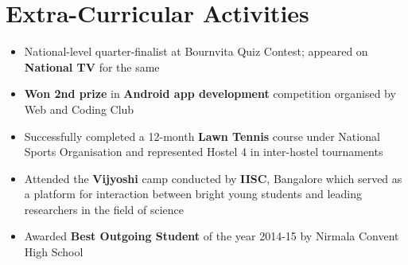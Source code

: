 \documentclass[10pt,letterpaper,sans]{moderncv}
\begin{document}
\section{Extra-Curricular Activities}
\vspace{3pt}
\begin{itemize}
\item National-level quarter-finalist at Bournvita Quiz Contest; appeared on \textbf{National TV} for the same
\item \textbf{Won 2nd prize} in \textbf{Android app development} competition organised by Web and Coding Club
\item Successfully completed a 12-month \textbf{Lawn Tennis} course under National Sports Organisation and represented Hostel 4 in inter-hostel tournaments
\item Attended the \textbf{Vijyoshi} camp conducted by \textbf{IISC}, Bangalore which served as a platform for interaction between bright young students and leading researchers in the field of science
\item Awarded \textbf{Best Outgoing Student} of the year 2014-15 by Nirmala Convent High School
\end{itemize}
\end{document}
